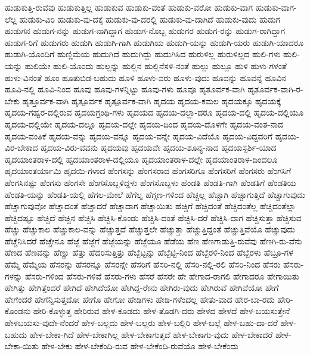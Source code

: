 {ಹುಡುಕುತ್ತಿ-ರುವೆವು
ಹುಡುಕುತ್ತಿಲ್ಲ
ಹುಡುಕುವ
ಹುಡುಕು-ವಂತೆ
ಹುಡುಕು-ವರೋ
ಹುಡುಕು-ವಾಗ
ಹುಡುಕು-ವಾಗ-ಲೆಲ್ಲ
ಹುಡುಕು-ವಿರಿ
ಹುಡುಕು-ವು-ದಕ್ಕೆ
ಹುಡುಕು-ವು-ದರಲ್ಲಿ
ಹುಡುಕು-ವು-ದಾಗಿದೆ
ಹುಡುಕು-ವುದು
ಹುಡುಗ
ಹುಡುಗನ
ಹುಡುಗ-ನನ್ನು
ಹುಡುಗ-ನಾಗಿದ್ದಾಗ
ಹುಡುಗ-ನೊಬ್ಬ
ಹುಡುಗರ
ಹುಡುಗ-ರನ್ನು
ಹುಡುಗ-ರಾಗಿದ್ದಾಗ
ಹುಡುಗ-ರಿಗೆ
ಹುಡುಗರು
ಹುಡುಗಿ
ಹುಡುಗಿ-ಗಾಗಿ
ಹುಡುಗಿಯ
ಹುಡುಗಿ-ಯನ್ನು
ಹುಡುಗಿ-ಯರು
ಹುಡುಗಿ-ಯಾದರೂ
ಹುಡುಗಿ-ಯೊಂದಿಗೆ
ಹುಣ್ಣಿಮೆಯ
ಹುದುಗಿದೆ
ಹುದುಗಿದ್ದು
ಹುದುಗಿಸಿದ
ಹುರುಳಿಲ್ಲ
ಹುರುಳಿಲ್ಲದ
ಹುಲಿ-ಗಳು
ಹುಲಿ-ಯನ್ನು
ಹುಲಿಯೇ
ಹುಲಿ-ಯೊಂದು
ಹುಲ್ಲನ್ನು
ಹುಲ್ಲಿನ
ಹುಲ್ಲಿನೆಸಳಿ-ನಂತೆ
ಹುಲ್ಲು
ಹುಲ್ಲೂ
ಹುಳಿ
ಹುಳು-ಗಳಂತೆ
ಹುಳು-ವಿನಂತೆ
ಹೂಂ
ಹೂತುಬಿಡ-ಬಹುದು
ಹೂಳಿ
ಹೂಳು-ವರು
ಹೂಳು-ವುದು
ಹೂವನ್ನು
ಹೂವನ್ನೆ
ಹೂವಿನ
ಹೂವಿ-ನಲ್ಲಿ
ಹೂವಿ-ನಿಂದ
ಹೂವು
ಹೂವು-ಗಳನ್ನಿಟ್ಟು
ಹೂವು-ಗಳು
ಹೂವೂ
ಹೃತೂರ್ವಕ-ವಾಗಿ
ಹೃತೂರ್ವಕ-ವಾಗಿ-ರ-ಬೇಕು
ಹೃತ್ತೂರ್ವಕ-ವಾಗಿ
ಹೃತ್ಪೂರ್ವಕ
ಹೃತ್ಪೂರ್ವಕ-ವಾಗಿ
ಹೃದಯ
ಹೃದಯ-ಕಮಲ
ಹೃದಯಕ್ಕೂ
ಹೃದಯಕ್ಕೆ
ಹೃದಯ-ಗಹ್ವರ-ದಲ್ಲಿರುವ
ಹೃದಯಗ್ರಂಥಿ-ಗಳು
ಹೃದಯದ
ಹೃದಯ-ದಲ್ಲಾ-ದರೂ
ಹೃದಯ-ದಲ್ಲಿ
ಹೃದಯ-ದಲ್ಲಿಯೂ
ಹೃದಯ-ದಲ್ಲಿಯೇ
ಹೃದಯ-ದಲ್ಲೂ
ಹೃದಯ-ದಲ್ಲೇ
ಹೃದಯ-ದಿಂದ
ಹೃದಯ-ದೊಳಗೇ
ಹೃದಯ-ವಂತ-ನಾದ
ಹೃದಯ-ವಂತಿಕೆ
ಹೃದಯ-ವನ್ನು
ಹೃದಯ-ವನ್ನೂ
ಹೃದಯ-ವನ್ನೇ
ಹೃದಯ-ವಿದೆಯೊ
ಹೃದಯ-ವಿದ್ದವರಿಗೆ
ಹೃದಯ-ವಿರ-ಬೇಕಾದ
ಹೃದಯ-ವಿರು-ವವನು
ಹೃದಯವು
ಹೃದಯವೇ
ಹೃದಯ-ಶೂನ್ಯ-ನಾದ
ಹೃದಯಸ್ಪರ್ಶಿ-ಯಾದ
ಹೃದಯಾಂತರಾಳ-ದಲ್ಲಿ
ಹೃದಯಾಂತರಾಳ-ದಲ್ಲಿಯೂ
ಹೃದಯಾಂತರಾಳ-ದಲ್ಲೇ
ಹೃದಯಾಂತರಾಳ-ದಿಂದಲೂ
ಹೃದಯಾಂತರ್ಯಾಮಿ
ಹೃದಯಿ-ಗಳಾದ
ಹೆಂಗಸನ್ನು
ಹೆಂಗಸರಾದ
ಹೆಂಗಸರಿಗೂ
ಹೆಂಗಸರಿಗೆ
ಹೆಂಗಸರು
ಹೆಂಗಸಿಗೆ
ಹೆಂಗಸಿನಷ್ಟು
ಹೆಂಗಸು
ಹೆಂಗಸೇ
ಹೆಂಗಸೊಬ್ಬಳಿದ್ದಳು
ಹೆಂಗಸೊಬ್ಬಳು
ಹೆಂಡತಿ
ಹೆಂಡತಿ-ಗಾಗಿ
ಹೆಂಡತಿಗೆ
ಹೆಂಡತಿಯ
ಹೆಂಡತಿ-ಯನ್ನು
ಹೆಂಡತಿ-ಯಲ್ಲಿ
ಹೆಗಲ-ಮೇಲೆ
ಹೆಗೆಲ್ನ
ಹೆಗ್ಗಣ-ಗಳಿಂದ
ಹೆಚ್ಚಲ್ಲ
ಹೆಚ್ಚಾಗಿ
ಹೆಚ್ಚಾಗುತ್ತಿದೆ
ಹೆಚ್ಚಾಗುವುದು
ಹೆಚ್ಚಾಗುವುವೋ
ಹೆಚ್ಚಾದಂತೆ
ಹೆಚ್ಚಾದರೆ
ಹೆಚ್ಚಾದಾಗ
ಹೆಚ್ಚಾಯಿತು
ಹೆಚ್ಚಿಗೆ
ಹೆಚ್ಚಿದಂತೆ
ಹೆಚ್ಚಿದಂತೆಲ್ಲ
ಹೆಚ್ಚಿದಂತೆಲ್ಲಾ
ಹೆಚ್ಚಿದಷ್ಟೂ
ಹೆಚ್ಚಿದೆ
ಹೆಚ್ಚಿನ
ಹೆಚ್ಚಿಸಿ
ಹೆಚ್ಚಿಸಿ-ಕೊಂಡು
ಹೆಚ್ಚಿಸಿ-ದಂತೆ
ಹೆಚ್ಚಿಸಿ-ದರೆ
ಹೆಚ್ಚಿಸಿ-ದಾಗ
ಹೆಚ್ಚಿಸುತ್ತಾ
ಹೆಚ್ಚಿಸುವ
ಹೆಚ್ಚು
ಹೆಚ್ಚುಕಾಲ
ಹೆಚ್ಚುಕಾಲ-ವನ್ನು
ಹೆಚ್ಚುತ್ತದೆ
ಹೆಚ್ಚುತ್ತಲೇ
ಹೆಚ್ಚುತ್ತಾ
ಹೆಚ್ಚುತ್ತಿದ್ದಂತೆ
ಹೆಚ್ಚುತ್ತಿವೆಯೊ
ಹೆಚ್ಚುವುದು
ಹೆಚ್ಚೆನಿಸಿದರೆ
ಹೆಚ್ಚೇನೂ
ಹೆಜ್ಜೆ
ಹೆಜ್ಜೆಗೆ
ಹೆಜ್ಜೆಯನ್ನು
ಹೆಜ್ಜೆಯೂ
ಹೆಡೆಯ
ಹೆಣ
ಹೆಣಗಾಡುತ್ತಿ-ರುವೆವು
ಹೆಣಗಿ-ರು-ವೆನು
ಹೆಣದ
ಹೆಣವನ್ನು
ಹೆಣ್ಣು
ಹೆತ್ತು
ಹೆದರಿಸುತ್ತಿತ್ತು
ಹೆಬ್ಬೆಟ್ಟನ್ನು
ಹೆಬ್ಬೆಟ್ಟಿ-ನಿಂದ
ಹೆಬ್ಬೆರಳಿ-ನಿಂದ
ಹೆಬ್ಬೆರಳು
ಹೆಬ್ರೂ-ಗಳ
ಹೆಮ್ಮೆ
ಹೆಮ್ಮೆಯ
ಹೆಸರನ್ನು
ಹೆಸರನ್ನೂ
ಹೆಸರನ್ನೇ
ಹೆಸರಿಗೆ
ಹೆಸರಿ-ನಲ್ಲಿ
ಹೆಸರಿ-ನಲ್ಲಿ-ರಲಿ
ಹೆಸರಿ-ನಿಂದ
ಹೆಸರು
ಹೆಸರು-ಗಳನ್ನು
ಹೆಸರು-ಗಳಿಂದ
ಹೆಸರು-ಗಳಿವೆ
ಹೆಸರು-ಗಳು
ಹೆಸರೆ
ಹೆಸರೇ
ಹೇ
ಹೇಗಾದ-ರಾಗಲಿ
ಹೇಗಾದರೂ
ಹೇಗಾಯಿತು
ಹೇಗಿತ್ತು
ಹೇಗಿತ್ತೆಂದರೆ
ಹೇಗಿದೆ
ಹೇಗಿದೆಯೋ
ಹೇಗಿದ್ದ-ರೇನು
ಹೇಗಿರು-ವುದು
ಹೇಗಿರುವೆ
ಹೇಗಿವೆಯೋ
ಹೇಗೆ
ಹೇಗೆಂದರೆ
ಹೇಗೆನ್ನಿಸುತ್ತದೋ
ಹೇಗೊ
ಹೇಗೋ
ಹೇಡಿಗಳು
ಹೇಡಿ-ಗಳೆಂದಲ್ಲ
ಹೇತು-ವಾದ
ಹೇರ-ಬಾ-ರದು
ಹೇರಿ-ಕೊಂಡನು
ಹೇರಿ-ಕೊಳ್ಳುತ್ತ
ಹೇರಿರುವ
ಹೇಳ-ಕೂಡದು
ಹೇಳ-ತೊಡಗಿ-ದರು
ಹೇಳದ
ಹೇಳದೆ
ಹೇಳ-ಬಯಸುತ್ತೇನೆ
ಹೇಳಬಯಸು-ವುದೇ-ನೆಂದರೆ
ಹೇಳ-ಬಲ್ಲದು
ಹೇಳ-ಬಲ್ಲರು
ಹೇಳ-ಬಲ್ಲಿರಿ
ಹೇಳ-ಬಲ್ಲೆ
ಹೇಳ-ಬಹು-ದಾ-ದರೆ
ಹೇಳ-ಬಹುದು
ಹೇಳ-ಬೇಕಾ-ಗಿದೆ
ಹೇಳ-ಬೇಕಾಗಿಲ್ಲ
ಹೇಳ-ಬೇಕಾಗುತ್ತದೆ
ಹೇಳ-ಬೇಕಾಗು-ವುದು
ಹೇಳ-ಬೇಕಾದರೆ
ಹೇಳ-ಬೇಕಾ-ಯಿತು
ಹೇಳ-ಬೇಕು
ಹೇಳ-ಬೇಕೆಂದಿ-ರುವ
ಹೇಳ-ಬೇಕೆಂದಿ-ರುವೆಯೊ
ಹೇಳ-ಬೇಕೆಂದು
}
